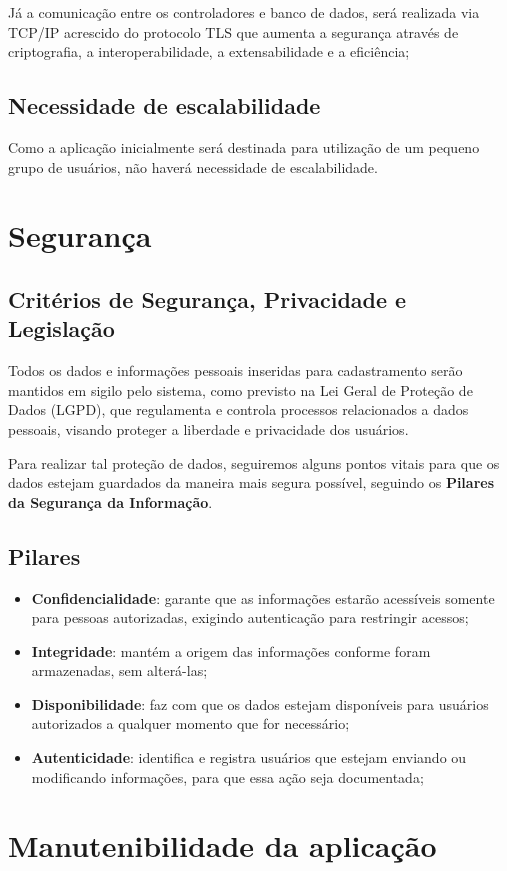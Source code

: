 \documentclass[
    12pt,               %
    openright,          %
    oneside,
    a4paper,            %
    paginasA3,  %
    MODELO,             %
    TODO,               %
    english,            %
    brazil              %
    ]{ifsp-spo-inf-ctds} %
\begin{document}
Já a comunicação entre os controladores e banco de dados, será realizada via TCP/IP acrescido do protocolo TLS que aumenta a segurança através de criptografia, a interoperabilidade, a extensabilidade e a eficiência;

\section{Necessidade de escalabilidade}
Como a aplicação inicialmente será destinada para utilização de um pequeno grupo de usuários, não haverá necessidade de escalabilidade.

\chapter {Segurança}
\section {Critérios de Segurança, Privacidade e Legislação}
Todos os dados e informações pessoais inseridas para cadastramento serão mantidos em sigilo pelo sistema, como previsto na Lei Geral de Proteção de Dados (LGPD), que regulamenta e controla processos relacionados a dados pessoais, visando proteger a liberdade e privacidade dos usuários.

Para realizar tal proteção de dados, seguiremos alguns pontos vitais para que os dados estejam guardados da maneira mais segura possível, seguindo os \textbf{Pilares da Segurança da Informação}.
\section {Pilares}
\begin{itemize}
\item \textbf{Confidencialidade}: garante que as informações estarão acessíveis somente para pessoas autorizadas, exigindo autenticação para restringir acessos;
\item \textbf{Integridade}: mantém a origem das informações conforme foram armazenadas, sem alterá-las;
\item \textbf{Disponibilidade}: faz com que os dados estejam disponíveis para usuários autorizados a qualquer momento que for necessário;
\item \textbf{Autenticidade}: identifica e registra usuários que estejam enviando ou modificando informações, para que essa ação seja documentada;
\end{itemize}


\chapter{Manutenibilidade da aplicação}
\end{document}

